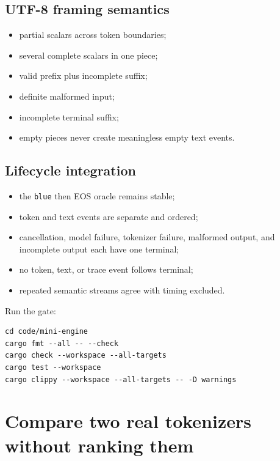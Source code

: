 \subsection{UTF-8 framing semantics}\label{utf-8-framing-semantics}

\begin{itemize}
\tightlist
\item
  partial scalars across token boundaries;
\item
  several complete scalars in one piece;
\item
  valid prefix plus incomplete suffix;
\item
  definite malformed input;
\item
  incomplete terminal suffix;
\item
  empty pieces never create meaningless empty text events.
\end{itemize}

\subsection{Lifecycle integration}\label{lifecycle-integration}

\begin{itemize}
\tightlist
\item
  the \texttt{blue} then EOS oracle remains stable;
\item
  token and text events are separate and ordered;
\item
  cancellation, model failure, tokenizer failure, malformed output, and
  incomplete output each have one terminal;
\item
  no token, text, or trace event follows terminal;
\item
  repeated semantic streams agree with timing excluded.
\end{itemize}

Run the gate:

\begin{verbatim}
cd code/mini-engine
cargo fmt --all -- --check
cargo check --workspace --all-targets
cargo test --workspace
cargo clippy --workspace --all-targets -- -D warnings
\end{verbatim}

\section{Compare two real tokenizers without ranking
them}\label{compare-two-real-tokenizers-without-ranking-them}

